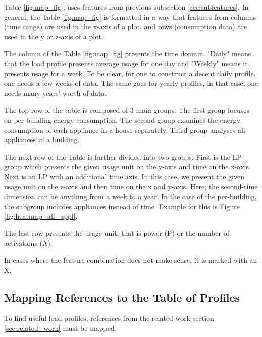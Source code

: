 Table \ref{fig:map_fig}, uses features from previous subsection \ref{sec:subfeatures}. 
In general, the Table \ref{fig:map_fig} is formatted in a way that features from columns (time range) are
used in the x-axis of a plot, and rows (consumption data) are used in the y or z-axis of a plot. 

The column of the Table \ref{fig:map_fig} presents the time domain.
"Daily" means that the load profile presents average usage for one day and "Weekly" means it presents usage for a week.
To be clear, for one to construct a decent daily profile, one needs a few weeks of data. 
The same goes for yearly profiles, in that case, one needs many years' worth of data. 

The top row of the table is composed of 3 main groups. 
The first group focuses on per-building energy consumption.
The second group examines the energy consumption of each appliance in a house separately.
Third group analyses all appliances in a building.

The next row of the Table is further divided into two groups. 
First is the LP group which presents the given usage unit on the y-axis and time on the x-axis. 
Next is an LP with an additional time axis. 
In this case, we present the given usage unit on the z-axis and then time on the x and y-axis.
Here, the second-time dimension can be anything from a week to a year.
In the case of the per-building, the subgroup includes appliances instead of time. 
Example for this is Figure \ref{fig:heatmap_all_appl}.

The last row presents the usage unit, that is power (P) or the number of activations (A).

In cases where the feature combination does not make sense, it is marked with an X.

\subsection{Mapping References to the Table of Profiles}

To find useful load profiles, references from the related work section \ref{sec:related_work} must be mapped.

